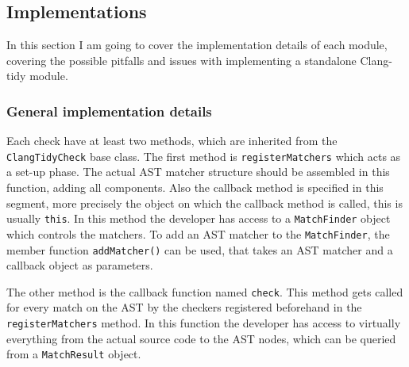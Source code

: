 \subsection{Implementations}
\par In this section I am going to cover the implementation details of each module, covering the possible pitfalls and issues with implementing a standalone Clang-tidy module.  
\subsubsection{General implementation details}
\par Each check have at least two methods, which are inherited from the \verb|ClangTidyCheck| base class. The first method is \verb|registerMatchers| which acts as a set-up phase. The actual AST matcher structure should be assembled in this function, adding all components. Also the callback method is specified in this segment, more precisely the object on which the callback method is called, this is usually \verb|this|. In this method the developer has access to a \verb|MatchFinder| object which controls the matchers. To add an AST matcher to the \verb|MatchFinder|, the member function \verb|addMatcher()| can be used, that takes an AST matcher and a callback object as parameters. \medskip
\par The other method is the callback function named \verb|check|. This method gets called for every match on the AST by the checkers registered beforehand in the \verb|registerMatchers| method. In this function the developer has access to virtually everything from the actual source code to the AST nodes, which can be queried from a \verb|MatchResult| object.
